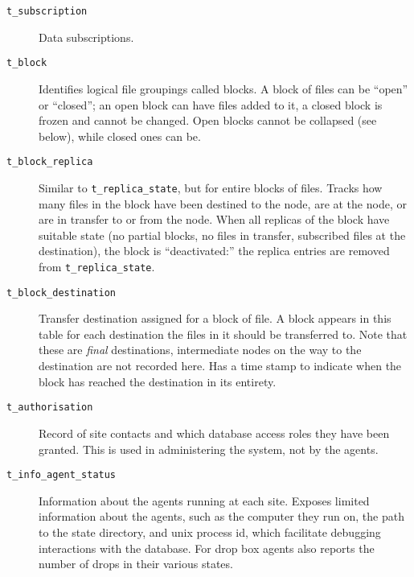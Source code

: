 \documentclass{cmspaper}
\begin{document}
\begin{description}
  \item [\texttt{t\_subscription}]\mbox{}

    Data subscriptions.

  \item [\texttt{t\_block}]\mbox{}

    Identifies logical file groupings called blocks.  A block of
    files can be ``open'' or ``closed''; an open block can have
    files added to it, a closed block is frozen and cannot be
    changed.  Open blocks cannot be collapsed (see below), while
    closed ones can be.

  \item [\texttt{t\_block\_replica}]\mbox{}

    Similar to \texttt{t\_replica\_state}, but for entire blocks of
    files.  Tracks how many files in the block have been destined
    to the node, are at the node, or are in transfer to or from
    the node.  When all replicas of the block have suitable state
    (no partial blocks, no files in transfer, subscribed files at
    the destination), the block is ``deactivated:'' the replica
    entries are removed from \texttt{t\_replica\_state}.

  \item [\texttt{t\_block\_destination}]\mbox{}

    Transfer destination assigned for a block of file.  A block
    appears in this table for each destination the files in it
    should be transferred to.  Note that these are {\em final}
    destinations, intermediate nodes on the way to the
    destination are not recorded here.  Has a time stamp to
    indicate when the block has reached the destination in its
    entirety.

  \item [\texttt{t\_authorisation}]\mbox{}

    Record of site contacts and which database access roles they
    have been granted.  This is used in administering the system,
    not by the agents.
    
  \item [\texttt{t\_info\_agent\_status}]\mbox{}

    Information about the agents running at each site.  Exposes
    limited information about the agents, such as the computer
    they run on, the path to the state directory, and unix process
    id, which facilitate debugging interactions with the database.
    For drop box agents also reports the number of drops in their
    various states.


\end{description}
\end{document}
